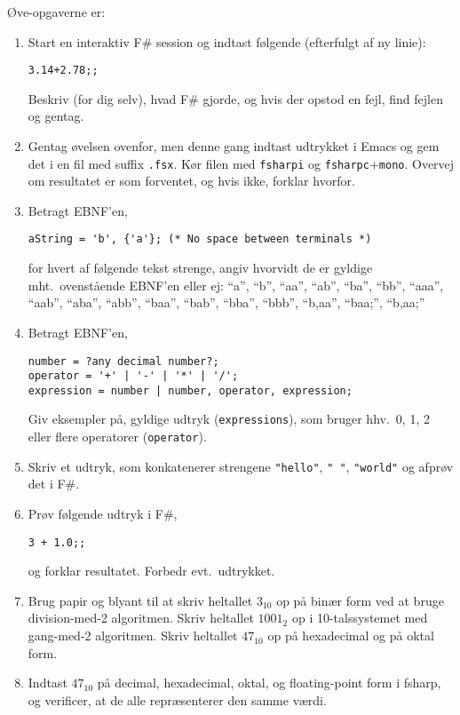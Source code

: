 \documentclass[a4paper,12pt]{article}
\begin{document}
Øve-opgaverne er:
\begin{enumerate}[label=2ø.\arabic*,start=0]
\item Start en interaktiv F\# session og indtast følgende (efterfulgt af ny linie):
\begin{lstlisting}
3.14+2.78;;
\end{lstlisting}
Beskriv (for dig selv), hvad F\# gjorde, og hvis der opstod en fejl, find fejlen og gentag.
\item Gentag øvelsen ovenfor, men denne gang indtast udtrykket i Emacs og gem det i en fil med suffix \verb|.fsx|. Kør filen med \lstinline[language=console]{fsharpi} og \lstinline[language=console]{fsharpc}+\lstinline[language=console]{mono}. Overvej om resultatet er som forventet, og hvis ikke, forklar hvorfor.
\item Betragt EBNF'en,
\begin{lstlisting}[language=ebnf]
aString = 'b', {'a'}; (* No space between terminals *)
\end{lstlisting}
for hvert af følgende tekst strenge, angiv hvorvidt de er gyldige mht.\ ovenstående EBNF'en eller ej: "`a"', "`b"', "`aa"', "`ab"', "`ba"', "`bb"', "`aaa"', "`aab"', "`aba"', "`abb"', "`baa"', "`bab"', "`bba"', "`bbb"', "`b,aa"', "`baa;"', "`b,aa;"'
\item Betragt EBNF'en,
\begin{lstlisting}[language=ebnf]
number = ?any decimal number?;
operator = '+' | '-' | '*' | '/';
expression = number | number, operator, expression;
\end{lstlisting}
Giv eksempler på,  gyldige udtryk (\lstinline[language=ebnf]{expressions}), som bruger hhv.\ 0, 1, 2 eller flere operatorer (\lstinline[language=ebnf]{operator}).
\item Skriv et udtryk, som konkatenerer strengene \lstinline{"hello"}, \lstinline{" "}, \lstinline{"world"} og afprøv det i F\#.
\item Prøv følgende udtryk i F\#,
\begin{lstlisting}
3 + 1.0;;
\end{lstlisting}
og forklar resultatet. Forbedr evt.\ udtrykket.
\item Brug papir og blyant til at skriv heltallet $3_{10}$ op på binær form ved at bruge division-med-2 algoritmen. Skriv heltallet $1001_2$ op i 10-talssystemet med gang-med-2 algoritmen. Skriv heltallet $47_{10}$ op på hexadecimal og på oktal form.
\item Indtast $47_{10}$ på decimal, hexadecimal, oktal, og floating-point form i fsharp, og verificer, at de alle repræsenterer den samme værdi.

\end{enumerate}
\end{document}

